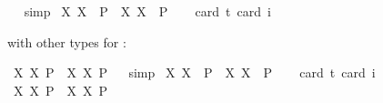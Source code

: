 \begin{isabellebody}
\ %
%
\isamarkupfalse%
\ simp%
%
%
\isanewline
{}\isamarkupfalse%
\ {\isachardoublequoteopen}{\isasymlfloor}{\isacharparenleft}{\isasymlambda}X{\isachardot}\ \isactrlbold {\isasymdiamond}\isactrlbold {\isasymexists}X{\isacharparenright}\ \ {\isacharparenleft}P{\isacharcolon}{\isacharcolon}{\isasymup}{\isasymlangle}{\isasymzero}{\isasymrangle}{\isacharparenright}\ \isactrlbold {\isasymrightarrow}\ {\isacharparenleft}{\isasymlambda}X{\isachardot}\ \isactrlbold {\isasymexists}X{\isacharparenright}\ \ P{\isasymrfloor}{\isachardoublequoteclose}\ \isanewline
\ \ \isamarkupfalse%
{\isacharbrackleft}card\ {\isacharprime}t{\isacharequal}{}{\isacharcomma}\ card\ i{\isacharequal}{}{\isacharbrackright}%
\ %
%
\isamarkupfalse%
\ %
%
%
%
%
\begin{isamarkuptext}%
with other types for :%
\end{isamarkuptext}\isamarkuptrue%
\isamarkupfalse%
\ {\isachardoublequoteopen}{\isasymlfloor}{\isacharparenleft}{\isasymlambda}X{\isachardot}\ \isactrlbold {\isasymdiamond}\isactrlbold {\isasymexists}X{\isacharparenright}\ \isactrlbold {\isasymdown}{\isacharparenleft}P{\isacharcolon}{\isacharcolon}{\isasymup}{\isasymlangle}{\isasymup}{\isasymzero}{\isasymrangle}{\isacharparenright}\ \isactrlbold {\isasymrightarrow}\ {\isacharparenleft}{\isasymlambda}X{\isachardot}\ \isactrlbold {\isasymexists}X{\isacharparenright}\ \isactrlbold {\isasymdown}P{\isasymrfloor}{\isachardoublequoteclose}%
\ %
%
\isamarkupfalse%
\ simp%
%
%
\isanewline
{}\isamarkupfalse%
\ {\isachardoublequoteopen}{\isasymlfloor}{\isacharparenleft}{\isasymlambda}X{\isachardot}\ \isactrlbold {\isasymdiamond}\isactrlbold {\isasymexists}X{\isacharparenright}\ \ {\isacharparenleft}P{\isacharcolon}{\isacharcolon}{\isasymup}{\isasymlangle}{\isasymup}{\isasymzero}{\isasymrangle}{\isacharparenright}\ \isactrlbold {\isasymrightarrow}\ {\isacharparenleft}{\isasymlambda}X{\isachardot}\ \isactrlbold {\isasymexists}X{\isacharparenright}\ \ P{\isasymrfloor}{\isachardoublequoteclose}\ \isanewline
\ \ \isamarkupfalse%
{\isacharbrackleft}card\ {\isacharprime}t{\isacharequal}{}{\isacharcomma}\ card\ i{\isacharequal}{}{\isacharbrackright}%
\ %
%
\isamarkupfalse%
\ %
%
%
%
\isanewline
{}\isamarkupfalse%
\ {\isachardoublequoteopen}{\isasymlfloor}{\isacharparenleft}{\isasymlambda}X{\isachardot}\ \isactrlbold {\isasymdiamond}\isactrlbold {\isasymexists}X{\isacharparenright}\ \isactrlbold {\isasymdown}{\isacharparenleft}P{\isacharcolon}{\isacharcolon}{\isasymup}{\isasymlangle}{\isasymlangle}{\isasymzero}{\isasymrangle}{\isasymrangle}{\isacharparenright}\ \isactrlbold {\isasymrightarrow}\ {\isacharparenleft}{\isasymlambda}X{\isachardot}\ \isactrlbold {\isasymexists}X{\isacharparenright}\ \isactrlbold {\isasymdown}P{\isasymrfloor}{\isachardoublequoteclose}%

\end{isabellebody}
